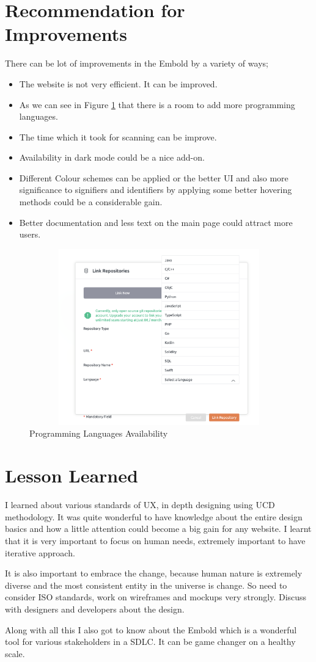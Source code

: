 \section{Recommendation for Improvements}
There can be lot of improvements in the Embold by a variety of ways; 
\begin{itemize} 
\item The website is not very efficient. It can be improved.
\item  As we can see in Figure \ref{fig:improve} that there is a room to add more programming languages.
\item The time which it took for scanning can be improve. 
\item Availability in dark mode could be a nice add-on.
\item Different Colour schemes can be applied or the better UI and also more significance to signifiers and identifiers by applying some better hovering methods could be a considerable gain.
\item Better documentation and less text on the main page could attract more users.   
\end{itemize}
\begin{figure}[htbp]
\begin{center}
\includegraphics[width=4.5in, height=3in]{negatives.png}
\caption{Programming Languages Availability}
\label{fig:improve}
\end{center}
\end{figure}
\section{Lesson Learned}
I learned about various standards of UX, in depth designing using UCD methodology. It was quite wonderful to have knowledge about the entire design basics and how a little attention could become a big gain for any website. I learnt that it is very important to focus on human needs, extremely important to have iterative approach.\par
It is also important to embrace the change, because human nature is extremely diverse and the most consistent entity in the universe is change. So need to consider ISO standards, work on wireframes and mockups very strongly. Discuss with designers and developers about the design. \par
Along with all this I also got to know about the Embold which is a wonderful tool for various stakeholders in a SDLC. It can be game changer on a healthy scale.

